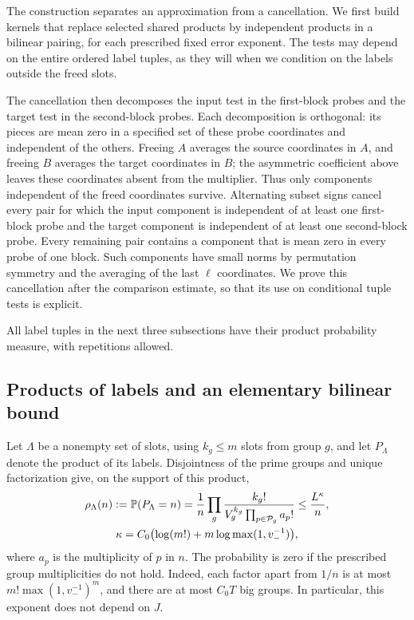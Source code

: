 The construction separates an approximation from a cancellation. We first
build kernels that replace selected shared products by independent products
in a bilinear pairing, for each prescribed fixed error exponent. The tests may depend on the entire ordered label tuples, as they
will when we condition on the labels outside the freed slots.

The cancellation then decomposes the input test in the first-block probes
and the target test in the second-block probes. Each decomposition is
orthogonal: its pieces are mean zero in a specified set of these probe
coordinates and independent of the others. Freeing $A$ averages the
source coordinates in $A$, and freeing $B$ averages the target coordinates
in $B$; the asymmetric coefficient above leaves these coordinates absent
from the multiplier. Thus only components independent of the freed
coordinates survive. Alternating subset signs cancel every pair for which the input component
is independent of at least one first-block probe and the target component
is independent of at least one second-block probe.
Every remaining pair contains a component that is mean zero in every
probe of one block. Such components have small norms by permutation
symmetry and the averaging of the last $\ell$ coordinates. We prove this cancellation after the
comparison estimate, so that its use on conditional tuple tests is explicit.

All label tuples in the next three subsections have their product
probability measure, with repetitions allowed.

\subsection{Products of labels and an elementary bilinear bound}

Let $\Lambda$ be a nonempty set of slots, using $k_g\leq m$ slots
from group $g$, and let $P_\Lambda$ denote the product of its labels.
Disjointness of the prime groups and unique factorization give, on
the support of this product,
\begin{equation}\label{eq:ideal-product-atom}
\begin{gathered}
 \rho_\Lambda(n):=\mathbb P(P_\Lambda=n)
 =\frac1n\prod_g
     \frac{k_g!}{V_g^{k_g}\prod_{p\in\mathcal P_g}a_p!}
 \leq\frac{L^\kappa}{n},\\
 \kappa=C_0\bigl(\log(m!)+m\log\max(1,v_-^{-1})\bigr),
\end{gathered}
\end{equation}
where $a_p$ is the multiplicity of $p$ in $n$.  The probability is
zero if the prescribed group multiplicities do not hold.  Indeed,
each factor apart from $1/n$ is at most
$m!\max(1,v_-^{-1})^m$, and there are at most $C_0T$ big groups.
In particular, this exponent does not depend on $J$.

